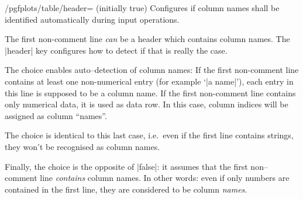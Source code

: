 \begin{key}{/pgfplots/table/header= (initially true)}
	Configures if column names shall be identified automatically during input operations.

	The first non-comment line \emph{can} be a header which contains column names. The |header| key configures how to detect if that is really the case. 
	
	The choice  enables auto--detection of column names: If the first non-comment line contains at least one non-numerical entry (for example `|a name|'), each entry in this line is supposed to be a column name. If the first non-comment line contains only numerical data, it is used as data row. In this case, column indices will be assigned as column ``names''.

	The choice  is identical to this last case, i.e.\ even if the first line contains strings, they won't be recognised as column names.

	Finally, the choice  is the opposite of |false|: it assumes that the first non--comment line \emph{contains} column names. In other words: even if only numbers are contained in the first line, they are considered to be column \emph{names}.
\end{key}

